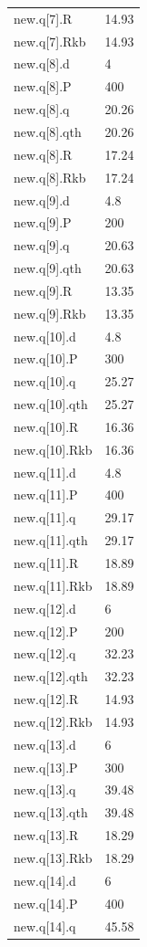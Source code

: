 {\begin{longtable}{p{}p{}}
{}new.q[7].R & 14.93\\
{}new.q[7].Rkb & 14.93\\
{}new.q[8].d & 4\\
{}new.q[8].P & 400\\
{}new.q[8].q & 20.26\\
{}new.q[8].qth & 20.26\\
{}new.q[8].R & 17.24\\
{}new.q[8].Rkb & 17.24\\
{}new.q[9].d & 4.8\\
{}new.q[9].P & 200\\
{}new.q[9].q & 20.63\\
{}new.q[9].qth & 20.63\\
{}new.q[9].R & 13.35\\
{}new.q[9].Rkb & 13.35\\
{}new.q[10].d & 4.8\\
{}new.q[10].P & 300\\
{}new.q[10].q & 25.27\\
{}new.q[10].qth & 25.27\\
{}new.q[10].R & 16.36\\
{}new.q[10].Rkb & 16.36\\
{}new.q[11].d & 4.8\\
{}new.q[11].P & 400\\
{}new.q[11].q & 29.17\\
{}new.q[11].qth & 29.17\\
{}new.q[11].R & 18.89\\
{}new.q[11].Rkb & 18.89\\
{}new.q[12].d & 6\\
{}new.q[12].P & 200\\
{}new.q[12].q & 32.23\\
{}new.q[12].qth & 32.23\\
{}new.q[12].R & 14.93\\
{}new.q[12].Rkb & 14.93\\
{}new.q[13].d & 6\\
{}new.q[13].P & 300\\
{}new.q[13].q & 39.48\\
{}new.q[13].qth & 39.48\\
{}new.q[13].R & 18.29\\
{}new.q[13].Rkb & 18.29\\
{}new.q[14].d & 6\\
{}new.q[14].P & 400\\
{}new.q[14].q & 45.58\\

\end{longtable}}
